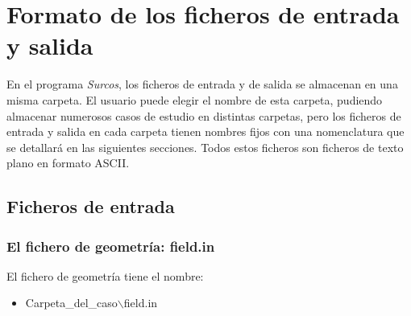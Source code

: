 \chapter{Formato de los ficheros de entrada y salida}

En el programa \emph{Surcos}, los ficheros de entrada y de salida se almacenan
en una misma carpeta. El usuario puede elegir el nombre de esta carpeta,
pudiendo almacenar numerosos casos de estudio en distintas carpetas, pero los
ficheros de entrada y salida en cada carpeta tienen nombres fijos con una
nomenclatura que se detallará en las siguientes secciones. Todos estos ficheros
son ficheros de texto plano en formato ASCII.

\section{Ficheros de entrada}

\subsection{El fichero de geometría: field.in}

El fichero de geometría tiene el nombre:
\begin{itemize}
\item Carpeta\_del\_caso$\backslash$field.in
\end{itemize}

